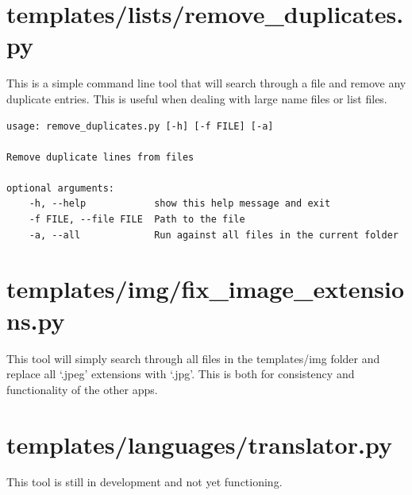 \section{templates/lists/remove\_duplicates.py}

This is a simple command line tool that will search through a file and remove any duplicate entries. This is useful when dealing with large name files or list files.

\begin{lstlisting}
usage: remove_duplicates.py [-h] [-f FILE] [-a]

Remove duplicate lines from files

optional arguments:
	-h, --help            show this help message and exit
	-f FILE, --file FILE  Path to the file
	-a, --all             Run against all files in the current folder
\end{lstlisting}














\section{templates/img/fix\_image\_extensions.py}

This tool will simply search through all files in the templates/img folder and replace all `.jpeg' extensions with `.jpg'. This is both for consistency and  functionality of the other apps.



















\section{templates/languages/translator.py}

This tool is still in development and not yet functioning.



















